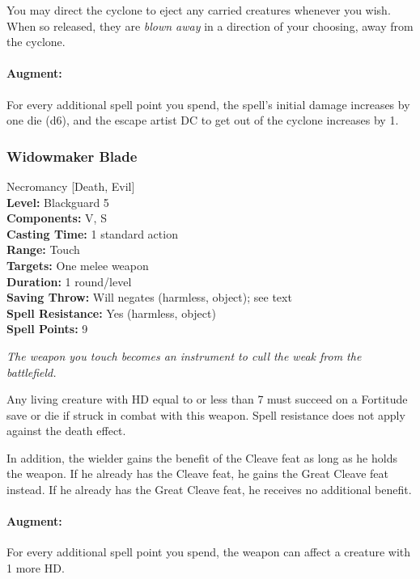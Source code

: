 You may direct the cyclone to eject any carried creatures whenever you wish. When so released, they are \emph{blown away} in a direction of your choosing, away from the cyclone.

\paragraph{Augment:} For every additional spell point you spend, the spell's initial damage increases by one die (d6), and the escape artist DC to get out of the cyclone increases by 1.
\subsubsection{Widowmaker Blade}
\label{Spell:WidowmakerBlade}
Necromancy [Death, Evil]
\\ \textbf{Level:} Blackguard 5
\\ \textbf{Components:} V, S
\\ \textbf{Casting Time:} 1 standard action
\\ \textbf{Range:} Touch
\\ \textbf{Targets:} One melee weapon
\\ \textbf{Duration:} 1 round/level
\\ \textbf{Saving Throw:} Will negates (harmless, object); see text
\\ \textbf{Spell Resistance:} Yes (harmless, object)
\\ \textbf{Spell Points:} 9

\emph{The weapon you touch becomes an instrument to cull the weak from the battlefield.} 

Any living creature with HD equal to or less than 7 must succeed on a Fortitude save or die if struck in combat with this weapon. 
Spell resistance does not apply against the death effect.

In addition, the wielder gains the benefit of the Cleave feat as long as he holds the weapon. If he already has the Cleave feat, he gains the Great Cleave feat instead. If he already has the Great Cleave feat, he receives no additional benefit.

\paragraph{Augment:} For every additional spell point you spend, the weapon can affect a creature with 1 more HD.

